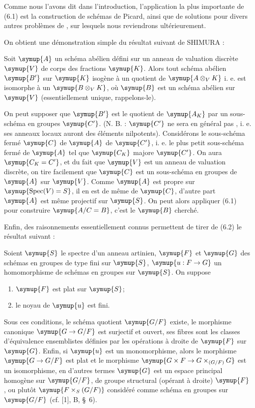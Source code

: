 
Comme nous l'avons dit dans l'introduction, l'application la plus importante
de (6.1) est la construction de schémas de Picard, ainsi que de solutions pour
divers autres problèmes de , sur lesquels nous reviendrons
ultérieurement.

On obtient une démonstration simple du résultat suivant de SHIMURA :

 Soit $\symup{A}$ un schéma abélien défini sur un anneau de
valuation discrète $\symup{V}$ de corps des fractions $\symup{K}$. Alors tout schéma abélien
$\symup{B'}$ sur $\symup{K}$ isogène à un quotient de $\symup{A\otimes_V K}$  i. e. est isomorphe à un $\symup{B\otimes_V K}$, où $\symup{B}$ est un
schéma abélien sur $\symup{V}$ (essentiellement unique, rappelons-le).

On peut supposer que $\symup{B'}$ est le quotient de $\symup{A_K}$ par un sous-schéma en
groupes $\symup{C'}$. (N. B. : $\symup{C'}$ ne sera en général pas , i. e. ses anneaux
locaux auront des éléments nilpotents). Considérons le sous-schéma fermé $\symup{C}$
de $\symup{A}$  de $\symup{C'}$, i. e. le plus petit sous-schéma fermé de $\symup{A}$ tel
que $\symup{C_K}$ majore $\symup{C'}$. On aura $\symup{C_K=C'}$, et du fait que $\symup{V}$ est un anneau de
valuation discrète, on tire facilement que $\symup{C}$ est un sous-schéma en groupes
de $\symup{A}$ sur $\symup{V}$. Comme $\symup{A}$ est propre sur $\symup{\operatorname{Spec}(V)=S}$, il en est
de même de $\symup{C}$, d'autre part $\symup{A}$ est même projectif sur $\symup{S}$. On peut alors
appliquer (6.1) pour construire $\symup{A/C=B}$,
c'est le $\symup{B}$ cherché.

Enfin, des raisonnements essentiellement connus permettent de tirer de (6.2)
le résultat suivant :

 Soient $\symup{S}$ le spectre d'un anneau artinien, $\symup{F}$ et
$\symup{G}$ des schémas en groupes de type fini sur $\symup{S}$, $\symup{u:F\to G}$ un homomorphisme
de schémas en groupes sur $\symup{S}$. On suppose
\begin{enumerate}
\item[(i)] $\symup{F}$ est plat sur $\symup{S}$;
\item[(ii)] le noyau de $\symup{u}$ est fini.
\end{enumerate}
Sous ces conditions, le schéma quotient $\symup{G/F}$ existe, le morphisme canonique
$\symup{G\to G/F}$ est surjectif et ouvert, ses fibres sont les classes d'équivalence
ensemblistes définies par les opérations à droite de $\symup{F}$ sur $\symup{G}$. Enfin, si
$\symup{u}$ est un monomorphisme, alors le morphisme $\symup{G\to G/F}$ est plat et le
morphisme $\symup{G\times F\to G\times_{(G/F)}G}$ est un isomorphisme, en d'autres termes $\symup{G}$ est un espace principal homogène
sur $\symup{G/F}$, de groupe structural (opérant à droite) $\symup{F}$, ou plutôt
$\symup{F\times_S(G/F)}$ considéré comme schéma en groupes sur $\symup{G/F}$ (cf. [1], B,
\S~6).

